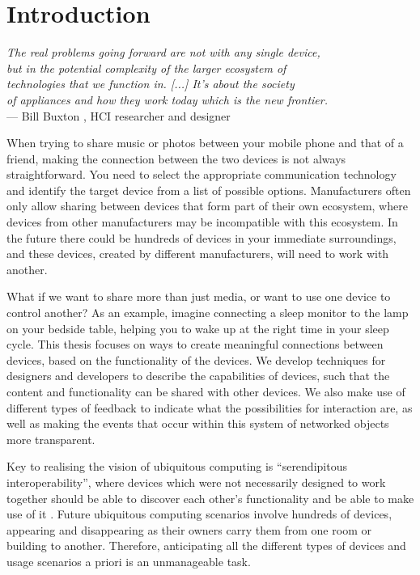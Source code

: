 \chapter{Introduction}
\label{Introduction}

\begin{flushright}{\slshape    
The real problems going forward are not with any single device, \\
but in the potential complexity of the larger ecosystem of \\
technologies that we function in. [...] It's about the society \\
of appliances and how they work today which is the new frontier.} \\ \medskip
    --- Bill Buxton \cite{Buxton2010}, HCI researcher and designer
\end{flushright}


When trying to share music or photos between your mobile phone and that of a friend, making the connection between the two devices is not always straightforward. You need to select the appropriate communication technology and identify the target device from a list of possible options. Manufacturers often only allow sharing between devices that form part of their own ecosystem, where devices from other manufacturers may be incompatible with this ecosystem. In the future there could be hundreds of devices in your immediate surroundings, and these devices, created by different manufacturers, will need to work with another.

What if we want to share more than just media, or want to use one device to control another? As an example, imagine connecting a sleep monitor to the lamp on your bedside table, helping you to wake up at the right time in your sleep cycle. This thesis focuses on ways to create meaningful connections between devices, based on the functionality of the devices. We develop techniques for designers and developers to describe the capabilities of devices, such that the content and functionality can be shared with other devices. We also make use of different types of feedback to indicate what the possibilities for interaction are, as well as making the events that occur within this system of networked objects more transparent.

Key to realising the vision of ubiquitous computing \cite{Weiser1991} is ``serendipitous interoperability'', where devices which were not necessarily designed to work together should be able to discover each other's functionality and be able to make use of it \cite{Owl2004}. Future ubiquitous computing scenarios involve hundreds of devices, appearing and disappearing as their owners carry them from one room or building to another. Therefore, anticipating all the different types of devices and usage scenarios a priori is an unmanageable task. 

